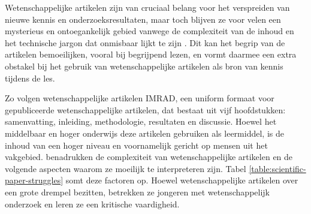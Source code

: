 Wetenschappelijke artikelen zijn van cruciaal belang voor het verspreiden van nieuwe kennis en onderzoeksresultaten, maar toch blijven ze voor velen een mysterieus en ontoegankelijk gebied vanwege de complexiteit van de inhoud en het technische jargon dat onmisbaar lijkt te zijn \autocite{Ball2017}. Dit kan het begrip van de artikelen bemoeilijken, vooral bij begrijpend lezen, en vormt daarmee een extra obstakel bij het gebruik van wetenschappelijke artikelen als bron van kennis tijdens de les. 

\medspace

Zo volgen wetenschappelijke artikelen IMRAD, een uniform formaat voor gepubliceerde wetenschappelijke artikelen, dat bestaat uit vijf hoofdstukken: samenvatting, inleiding, methodologie, resultaten en discussie. Hoewel het middelbaar en hoger onderwijs deze artikelen gebruiken als leermiddel,  is  de inhoud van een hoger niveau en voornamelijk gericht op mensen uit het vakgebied. \textcite{Pain2016, CAS2021} benadrukken de complexiteit van wetenschappelijke artikelen en de volgende aspecten waarom ze moeilijk te interpreteren zijn. Tabel \ref{table:scientific-paper-struggles} somt deze factoren op. Hoewel wetenschappelijke artikelen over een grote drempel bezitten, betrekken ze jongeren met wetenschappelijk onderzoek en leren ze een kritische vaardigheid. 

\medspace

